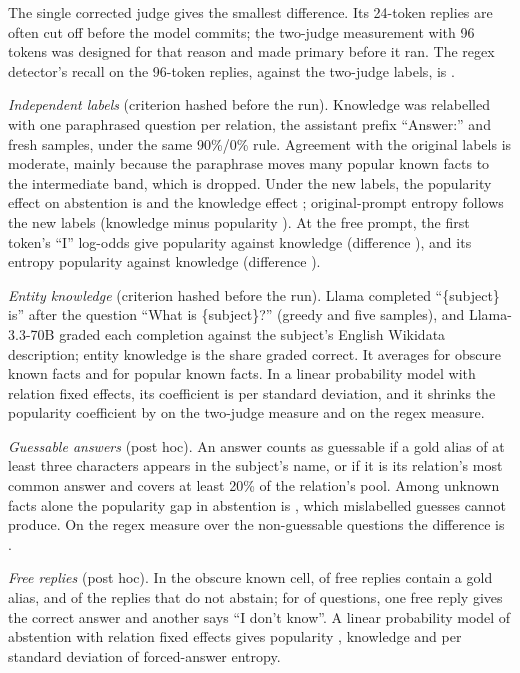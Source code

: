 \documentclass{article}
\newcommand{\idk}{``I don't know''}
\begin{document}
The single corrected judge gives the smallest difference. Its 24-token replies are often cut off before the model commits; the two-judge measurement with 96 tokens was designed for that reason and made primary before it ran. The regex detector's recall on the 96-token replies, against the two-judge labels, is \hmLlamaRegexRecall.

\emph{Independent labels} (criterion hashed before the run). Knowledge was relabelled with one paraphrased question per relation, the assistant prefix ``Answer:'' and fresh samples, under the same 90\%/0\% rule. Agreement with the original labels is moderate, mainly because the paraphrase moves many popular known facts to the intermediate band, which is dropped. Under the new labels, the popularity effect on abstention is \eoPop{} \eoPopCI{} and the knowledge effect \eoKnow{} \eoKnowCI; original-prompt entropy follows the new labels (knowledge minus popularity \eoEntKmP{} \eoEntKmPCI). At the free prompt, the first token's ``I'' log-odds give popularity \eoFreeIPop{} against knowledge \eoFreeIKnow{} (difference \eoFreeIDiff{} \eoFreeIDiffCI), and its entropy popularity \eoFreeEntPop{} against knowledge \eoFreeEntKnow{} (difference \eoFreeEntDiff{} \eoFreeEntDiffCI).

\emph{Entity knowledge} (criterion hashed before the run). Llama completed ``\{subject\} is'' after the question ``What is \{subject\}?'' (greedy and five samples), and Llama-3.3-70B graded each completion against the subject's English Wikidata description; entity knowledge is the share graded correct. It averages \ekObsKnown{} for obscure known facts and \ekPopKnown{} for popular known facts. In a linear probability model with relation fixed effects, its coefficient is \ekCoef{} \ekCoefCI{} per standard deviation, and it shrinks the popularity coefficient by \ekShrink{} on the two-judge measure and \ekShrinkRegex{} on the regex measure.

\emph{Guessable answers} (post hoc). An answer counts as guessable if a gold alias of at least three characters appears in the subject's name, or if it is its relation's most common answer and covers at least 20\% of the relation's pool. Among unknown facts alone the popularity gap in abstention is \hmLlamaPopUnkOnly{} \hmLlamaPopUnkOnlyCI, which mislabelled guesses cannot produce. On the regex measure over the \gsRegexN{} non-guessable questions the difference is \gsRegexDiff{} \gsRegexDiffCI.

\emph{Free replies} (post hoc). In the obscure known cell, \rcObsKnownCorrect{} of free replies contain a gold alias, and \rcObsKnownNonAbsCorrect{} of the replies that do not abstain; for \rcBothN{} of \rcBothOf{} questions, one free reply gives the correct answer and another says \idk. A linear probability model of abstention with relation fixed effects gives popularity \rcPopEnt{} \rcPopEntCI, knowledge \rcKnowEnt{} \rcKnowEntCI{} and \rcEntCoef{} per standard deviation of forced-answer entropy.
\end{document}
